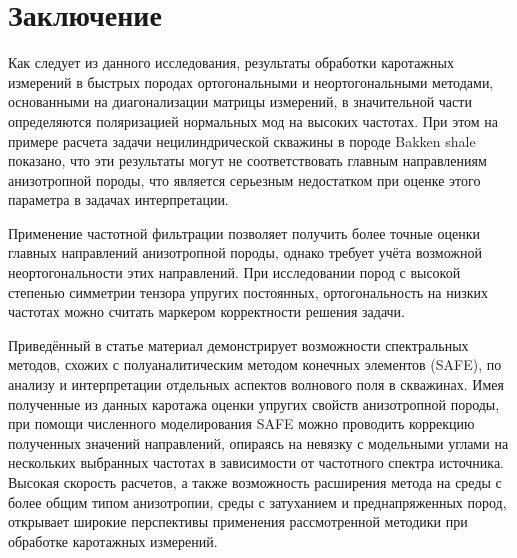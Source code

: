 \documentclass[a4paper,11pt]{article}
\begin{document}
\section{Заключение}

Как следует из данного исследования, результаты обработки каротажных измерений в быстрых породах ортогональными и неортогональными методами, основанными на диагонализации матрицы измерений, в значительной части определяются поляризацией нормальных мод на высоких частотах. При этом на примере расчета задачи нецилиндрической скважины в породе Bakken shale показано, что эти результаты могут не соответствовать главным направлениям анизотропной породы, что является серьезным недостатком при оценке этого параметра в задачах интерпретации. 


Применение частотной фильтрации позволяет получить более точные оценки главных направлений анизотропной породы, однако требует учёта возможной неортогональности этих направлений. При исследовании пород с высокой степенью симметрии тензора упругих постоянных, ортогональность на низких частотах можно считать маркером корректности решения задачи. 


Приведённый в статье материал демонстрирует возможности спектральных методов, схожих с полуаналитическим методом конечных элементов (SAFE), по анализу и интерпретации отдельных аспектов волнового поля в скважинах. Имея полученные из данных каротажа оценки упругих свойств анизотропной породы, при помощи численного моделирования SAFE можно проводить коррекцию полученных значений направлений, опираясь на невязку с модельными углами на нескольких выбранных частотах в зависимости от частотного спектра источника. Высокая скорость расчетов, а также возможность расширения метода на среды с более общим типом анизотропии, среды с затуханием и преднапряженных пород, открывает широкие перспективы применения рассмотренной методики при обработке каротажных измерений.

%
%
\end{document}
